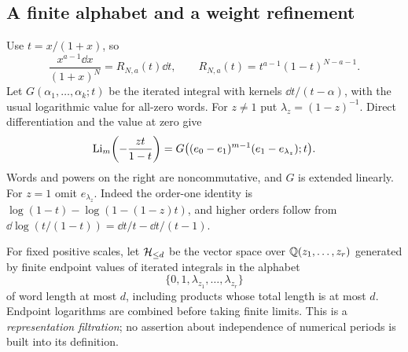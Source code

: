 \subsection{A finite alphabet and a weight refinement}
Use $t=x/(1+x)$, so
\begin{equation}\label{bmh:eq:compact-kernel}
 \frac{x^{a-1}\dd x}{(1+x)^N}
 =R_{N,a}(t)\dd t,
 \qquad R_{N,a}(t)=t^{a-1}(1-t)^{N-a-1}.
\end{equation}
Let $G(\alpha_1,\ldots,\alpha_k;t)$ be the iterated integral with kernels
$\dd t/(t-\alpha)$, with the usual logarithmic value for all-zero words.
For $z\ne1$ put $\lambda_z=(1-z)^{-1}$. Direct differentiation and the
value at zero give
\begin{equation}\label{bmh:eq:Landen-G}
 \operatorname{Li}_m\!\left(-\frac{zt}{1-t}\right)
 =G\big((e_0-e_1)^{m-1}(e_1-e_{\lambda_z});t\big).
\end{equation}
Words and powers on the right are noncommutative, and $G$ is extended
linearly. For $z=1$ omit $e_{\lambda_z}$. Indeed the order-one identity is
$\log(1-t)-\log(1-(1-z)t)$, and higher orders follow from
$\dd\log(t/(1-t))=\dd t/t-\dd t/(t-1)$.

For fixed positive scales, let $\mathcal H_{\le d}$ be the vector space over
$\mathbb Q(z_1,\ldots,z_r)$ generated by finite endpoint values of iterated
integrals in the alphabet
\begin{equation}\label{bmh:eq:alphabet}
 \{0,1,\lambda_{z_1},\ldots,\lambda_{z_r}\}
\end{equation}
of word length at most $d$, including products whose total length is
at most $d$. Endpoint logarithms are combined before taking finite
limits. This is a \emph{representation filtration}; no assertion about
independence of numerical periods is built into its definition.

